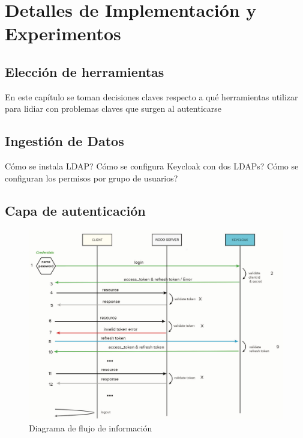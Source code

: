 \chapter{Detalles de Implementación y Experimentos}\label{chapter:implementation}

\section*{Elección de herramientas}
En este capítulo se toman decisiones claves respecto a qué herramientas utilizar para lidiar con problemas claves que surgen al autenticarse

\section*{Ingestión de Datos}

Cómo se instala LDAP?
Cómo se configura Keycloak con dos LDAPs?
Cómo se configuran los permisos por grupo de usuarios?

\section*{Capa de autenticación}

\begin{figure}[H]
	\centering	
	\hspace*{-0.3in}
	\includegraphics[width=1.1\linewidth]{"Graphics/diagrama de flujo del prototipo del servicio"}
	\caption{Diagrama de flujo de información}
	\label{fig:diagrama-de-flujo-del-prototipo-del-servicio}
\end{figure}


